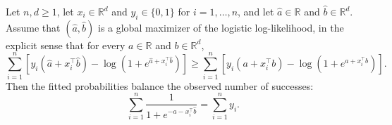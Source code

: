 \begin{theorem}
Let $n,d\ge1$, let $x_i\in\mathbb R^d$ and $y_i\in\{0,1\}$ for
$i=1,\ldots,n$, and let $\widehat a\in\mathbb R$ and
$\widehat b\in\mathbb R^d$.  Assume that $(\widehat a,\widehat b)$ is a
global maximizer of the logistic log-likelihood, in the explicit sense that
for every $a\in\mathbb R$ and $b\in\mathbb R^d$,
\[
 \sum_{i=1}^n\left[
   y_i(\widehat a+x_i^\top\widehat b)
   -\log\!\left(1+e^{\widehat a+x_i^\top\widehat b}\right)
 \right]
 \ge
 \sum_{i=1}^n\left[
   y_i(a+x_i^\top b)-\log\!\left(1+e^{a+x_i^\top b}\right)
 \right].
\]
Then the fitted probabilities balance the observed number of successes:
\[
  \sum_{i=1}^n\frac{1}{1+e^{-\widehat a-x_i^\top\widehat b}}
  =\sum_{i=1}^n y_i.
\]
\end{theorem}
